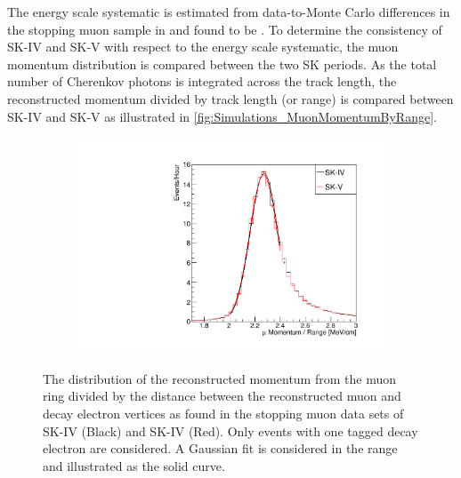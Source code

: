 The energy scale systematic is estimated from data-to-Monte Carlo differences in the stopping muon sample in \cite{sk_2017} and found to be . To determine the consistency of SK-IV and SK-V with respect to the energy scale systematic, the muon momentum distribution is compared between the two SK periods. As the total number of Cherenkov photons is integrated across the track length, the reconstructed momentum divided by track length (or range) is compared between SK-IV and SK-V as illustrated in \autoref{fig:Simulations_MuonMomentumByRange}.

\begin{figure}[h]
  \begin{subfigure}[t]{\textwidth}
    \includegraphics[width=\textwidth, trim={0mm 0mm 0mm 0mm}, clip, page=1]{Figures/Simulations/MuonRangeComparison.pdf}
  \end{subfigure}
  \caption{The distribution of the reconstructed momentum from the muon ring divided by the distance between the reconstructed muon and decay electron vertices as found in the stopping muon data sets of SK-IV (Black) and SK-IV (Red). Only events with one tagged decay electron are considered. A Gaussian fit is considered in the range  and illustrated as the solid curve.}
  \label{fig:Simulations_MuonMomentumByRange}
\end{figure}

